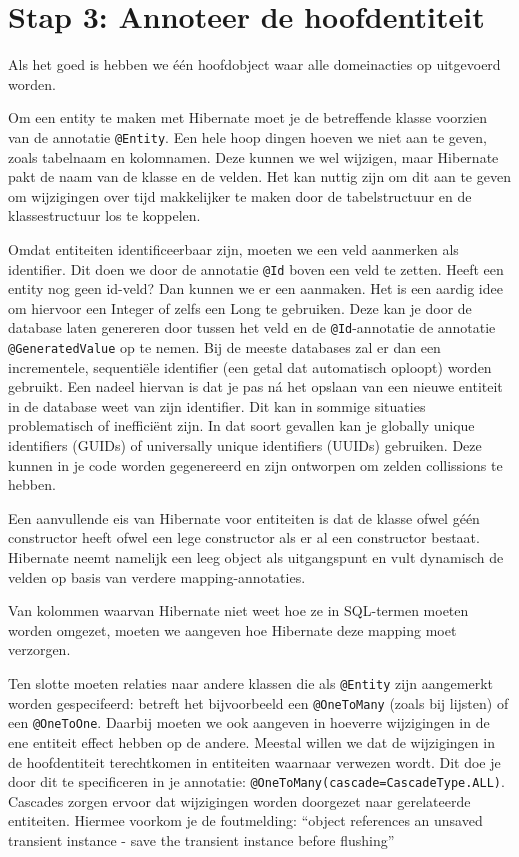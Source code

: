 \newpage
\section{Stap 3: Annoteer de hoofdentiteit}
Als het goed is hebben we één hoofdobject waar alle domeinacties
op uitgevoerd worden.

Om een entity te maken met Hibernate moet 
je de betreffende klasse voorzien van de 
annotatie \texttt{@Entity}. Een hele hoop dingen 
hoeven we niet aan te geven, zoals tabelnaam en kolomnamen.
Deze kunnen we wel wijzigen, maar Hibernate pakt de naam 
van de klasse en de velden. Het kan nuttig zijn om dit aan 
te geven om wijzigingen over tijd makkelijker te maken door
de tabelstructuur en de klassestructuur los te koppelen.

Omdat entiteiten
identificeerbaar zijn, moeten we een veld 
aanmerken als identifier. Dit doen we door de annotatie 
\texttt{@Id} boven een veld te zetten. Heeft een entity
nog geen id-veld? Dan kunnen we er een aanmaken. Het is 
een aardig idee om hiervoor een Integer of zelfs een Long 
te gebruiken. Deze kan je door de database laten genereren 
door tussen het veld en de \texttt{@Id}-annotatie 
de annotatie \texttt{@GeneratedValue} op te nemen. 
Bij de meeste databases zal er dan een incrementele, 
sequentiële identifier (een getal dat automatisch oploopt) 
worden gebruikt. Een nadeel hiervan is dat je pas ná het opslaan 
van een nieuwe entiteit in de database weet van zijn identifier. 
Dit kan in sommige situaties problematisch of inefficiënt zijn.
In dat soort gevallen kan je globally unique identifiers (GUIDs)
of universally unique identifiers (UUIDs) gebruiken. Deze kunnen 
in je code worden gegenereerd en zijn ontworpen om zelden collissions
te hebben.

Een aanvullende eis van Hibernate voor entiteiten is
dat de klasse ofwel géén constructor heeft 
ofwel een lege constructor als er al een constructor bestaat. 
Hibernate neemt namelijk een leeg 
object als uitgangspunt en vult dynamisch de velden op basis van 
verdere mapping-annotaties.

Van kolommen waarvan Hibernate niet weet hoe ze in SQL-termen moeten 
worden omgezet, moeten we aangeven hoe Hibernate deze mapping moet 
verzorgen.

Ten slotte moeten relaties naar andere klassen die als
\texttt{@Entity} zijn aangemerkt worden gespecifeerd:
betreft het bijvoorbeeld een \texttt{@OneToMany} (zoals bij lijsten) of een
\texttt{@OneToOne}. Daarbij moeten we ook aangeven in hoeverre 
wijzigingen in de ene entiteit effect hebben op de andere.
Meestal willen we dat de wijzigingen in de hoofdentiteit 
terechtkomen in entiteiten waarnaar verwezen wordt. 
Dit doe je door dit te specificeren in je 
annotatie: \texttt{@OneToMany(cascade=CascadeType.ALL)}. 
Cascades zorgen ervoor dat wijzigingen worden doorgezet 
naar gerelateerde entiteiten. 
Hiermee voorkom je de foutmelding: 
``object references an unsaved transient instance 
- save the transient instance before flushing''

